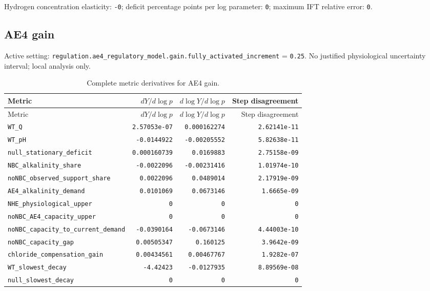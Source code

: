 Hydrogen concentration elasticity: \texttt{-0}; deficit percentage points per log parameter: \texttt{0}; maximum IFT relative error: \texttt{0}.\par

\subsection*{AE4 gain}
Active setting: \nolinkurl{regulation.ae4_regulatory_model.gain.fully_activated_increment} = \texttt{0.25}. No justified physiological uncertainty interval; local analysis only.


\begingroup\scriptsize
\setlength{\tabcolsep}{3pt}
\begin{longtable}{p{.44\linewidth}rrr}
\caption{Complete metric derivatives for AE4 gain.}\\
\toprule
Metric & $dY/d\log p$ & $d\log Y/d\log p$ & Step disagreement \\
\midrule\endfirsthead
\toprule
Metric & $dY/d\log p$ & $d\log Y/d\log p$ & Step disagreement \\
\midrule\endhead
\bottomrule\endfoot
\nolinkurl{WT_Q} & \texttt{2.57053e-07} & \texttt{0.000162274} & \texttt{2.62141e-11} \\
\nolinkurl{WT_pH} & \texttt{-0.0144922} & \texttt{-0.00205552} & \texttt{5.82638e-11} \\
\nolinkurl{null_stationary_deficit} & \texttt{0.000160739} & \texttt{0.0169883} & \texttt{2.75158e-09} \\
\nolinkurl{NBC_alkalinity_share} & \texttt{-0.0022096} & \texttt{-0.00231416} & \texttt{1.01974e-10} \\
\nolinkurl{noNBC_observed_support_share} & \texttt{0.0022096} & \texttt{0.0489014} & \texttt{2.17919e-09} \\
\nolinkurl{AE4_alkalinity_demand} & \texttt{0.0101069} & \texttt{0.0673146} & \texttt{1.6665e-09} \\
\nolinkurl{NHE_physiological_upper} & \texttt{0} & \texttt{0} & \texttt{0} \\
\nolinkurl{noNBC_AE4_capacity_upper} & \texttt{0} & \texttt{0} & \texttt{0} \\
\nolinkurl{noNBC_capacity_to_current_demand} & \texttt{-0.0390164} & \texttt{-0.0673146} & \texttt{4.44003e-10} \\
\nolinkurl{noNBC_capacity_gap} & \texttt{0.00505347} & \texttt{0.160125} & \texttt{3.9642e-09} \\
\nolinkurl{chloride_compensation_gain} & \texttt{0.00434561} & \texttt{0.00467767} & \texttt{1.9282e-07} \\
\nolinkurl{WT_slowest_decay} & \texttt{-4.42423} & \texttt{-0.0127935} & \texttt{8.89569e-08} \\
\nolinkurl{null_slowest_decay} & \texttt{0} & \texttt{0} & \texttt{0} \\
\end{longtable}
\endgroup

